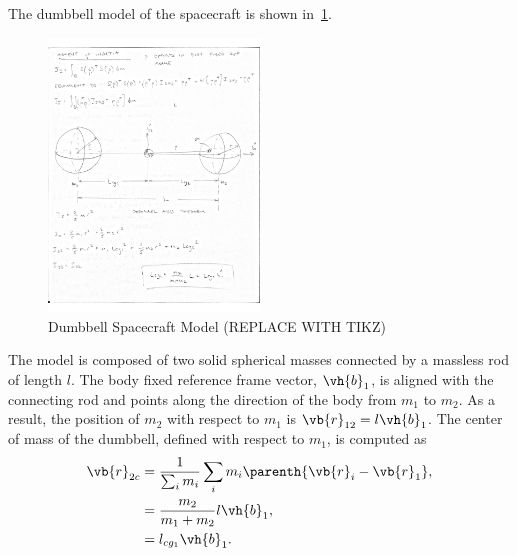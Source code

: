 \documentclass[11pt, reqno]{article}    %
\begin{document}
The dumbbell model of the spacecraft is shown in~\cref{fig:dumbbell_sc}.
\begin{figure}
    \centering
    \includegraphics[width=0.5\textwidth]{figures/dumbbell_model.pdf}
    \caption{Dumbbell Spacecraft Model (REPLACE WITH TIKZ)\label{fig:dumbbell_sc}}
\end{figure}
The model is composed of two solid spherical masses connected by a massless rod of length \( l\). 
The body fixed reference frame vector, \( \vh{b}_1\), is aligned with the connecting rod and points along the direction of the body from \( m_1 \) to \( m_2\).
As a result, the position of \( m_2 \) with respect to \( m_1\) is \( \vb{r}_{12} = l \vh{b}_1\).
The center of mass of the dumbbell, defined with respect to \( m_1\), is computed as
\begin{align}\label{eqn:com}
    \vb{r}_{2c} &= \frac{1}{\sum_i m_i} \sum_i m_i \parenth{\vb{r}_i - \vb{r}_1},\\
    &= \frac{m_2}{m_1+m_2} l \vh{b}_1 , \\
    &= l_{cg_{1}} \vh{b}_1 .
\end{align}
\end{document}
